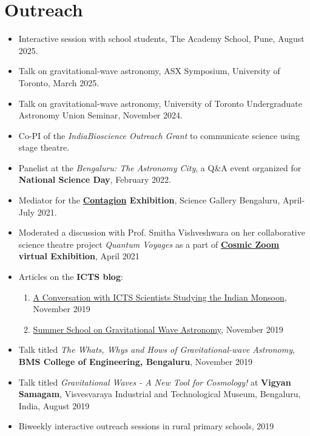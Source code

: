 		\section{Outreach}
		\begin{itemize}[leftmargin=*]
			\item Interactive session with school students, The Academy School, Pune, August 2025.
			\item Talk on gravitational-wave astronomy, ASX Symposium, University of Toronto, March 2025.
			\item Talk on gravitational-wave astronomy, University of Toronto Undergraduate Astronomy Union Seminar, November 2024.
			\item Co-PI of the \textit{IndiaBioscience Outreach Grant} to communicate science using stage theatre.
			\item Panelist at the \textit{Bengaluru: The Astronomy City}, a Q\&A event organized for \textbf{National Science Day}, February 2022.
			\item Mediator for the \textbf{\href{https://bengaluru.sciencegallery.com/contagion-archive}{Contagion} Exhibition}, Science Gallery Bengaluru, April-July 2021.
			\item Moderated a discussion with Prof. Smitha Vishveshwara on her collaborative science theatre project \textit{Quantum Voyages} as a part of \textbf{\href{https://cosmic-zoom.in/}{Cosmic Zoom} virtual Exhibition}, April 2021
			\item Articles on the \textbf{ICTS blog}:
			\begin{enumerate}
				\item \href{https://blog.icts.res.in/blog/conversation-icts-scientists-studying-indian-monsoon}{A Conversation with ICTS Scientists Studying the Indian Monsoon}, November 2019
				\item \href{https://blog.icts.res.in/blog/summer-school-gravitational-wave-astronomy}{Summer School on Gravitational Wave Astronomy}, November 2019
			\end{enumerate}	
			\item Talk titled \textit{The Whats, Whys and Hows of Gravitational-wave Astronomy}, \textbf{BMS College of Engineering, Bengaluru}, November 2019
			\item Talk titled \textit{Gravitational Waves - A New Tool for Cosmology!} at \textbf{Vigyan Samagam}, Visvesvaraya Industrial and Technological Museum, Bengaluru, India, August 2019
            \item Biweekly interactive outreach sessions in rural primary schools, 2019	
		\end{itemize}
		
